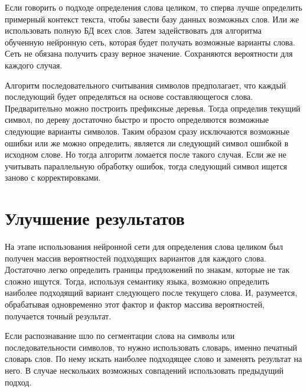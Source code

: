 Если говорить о подходе определения слова целиком, то сперва лучше определить примерный контекст текста, чтобы завести базу данных возможных слов. Или же использовать полную БД всех слов. Затем задействовать для алгоритма обученную нейронную сеть, которая будет получать возможные варианты слова. Сеть не обязана получить сразу верное значение. Сохраняются вероятности для каждого случая.

Алгоритм последовательного считывания символов предполагает, что каждый последующий будет определяться на основе составляющегося слова. Предварительно можно построить префиксные деревья. Тогда определив текущий символ, по дереву достаточно быстро и просто определяются возможные следующие варианты символов. Таким образом сразу исключаются возможные ошибки или же можно определить, является ли следующий символ ошибкой в исходном слове. Но тогда алгоритм ломается после такого случая. Если же не учитывать параллельную обработку ошибок, тогда следующий символ ищется заново с корректировками. 

\section{Улучшение результатов}  \label{ch3:sec3}

На этапе использования нейронной сети для определения слова целиком был получен массив вероятностей подходящих вариантов для каждого слова. Достаточно легко определить границы предложений по знакам, которые не так сложно ищутся. Тогда, используя семантику языка, возможно определить наиболее подходящий вариант следующего после текущего слова. И, разумеется, обрабатывая одновременно этот фактор и фактор массива вероятностей, получается точный результат. 

Если распознавание шло по сегментации слова на символы или последовательности символов, то нужно использовать словарь, именно печатный словарь слов. По нему искать наиболее подходящее слово и заменять результат на него. В случае нескольких возможных совпадений использовать предыдущий подход.








%
